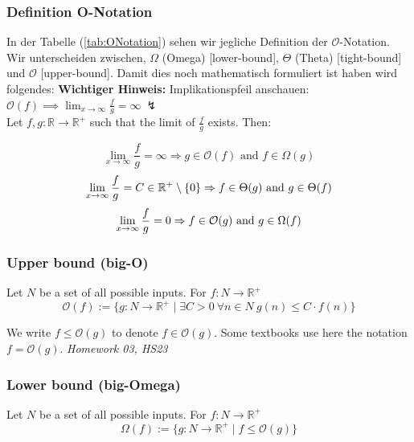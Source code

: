 \documentclass[a4paper]{article}
\begin{document}
    \subsubsection{Definition O-Notation}
    In der Tabelle (\ref{tab:ONotation}) sehen wir jegliche Definition der $\mathcal{O}$-Notation.
    Wir unterscheiden zwischen, $\Omega$ (Omega) [lower-bound], $\Theta$ (Theta) [tight-bound] und  $\mathcal{O}$ [upper-bound]. Damit dies noch mathematisch formuliert ist haben wird folgendes:   \textbf{Wichtiger Hinweis:} Implikationspfeil anschauen: $\mathcal{O}(f) \implies \lim_{x\to\infty}\frac fg = \infty \ \lightning$ \\
    Let $f, g: \mathbb{R} \rightarrow \mathbb{R}^+$ such that the limit of $\frac f g$ exists. Then:
    
    \begin{equation*}
    \lim_{x\to\infty}\frac fg = \infty \Rightarrow g \in \mathcal{O}(f) \text{ and } f \in \Omega(g)
    \end{equation*}
    \begin{equation*}
    \lim_{x \rightarrow \infty} \frac fg = C \in \mathbb{R}^+ \setminus \left\lbrace 0 \right\rbrace \Rightarrow f \in\Theta(g)  \text{ and } g \in\Theta(f) \\
    \end{equation*}
    \begin{equation*}
    \lim_{x \rightarrow \infty} \frac fg = 0 \Rightarrow f \in\mathcal{O}(g) \text{ and } g \in\Omega(f) \\
    \end{equation*}
    
    \subsubsection*{Upper bound (big-O)}
    Let ${N}$ be a set of all possible inputs. For $f: N \to \mathbb{R}^+$
    $$\mathcal{O}(f) :=\lbrace g: {N}\to\mathbb{R}^+\mid\exists C > 0 \ \forall n \in {N} \ g(n) \leq C \cdot f(n)\rbrace$$
    
    We write $f \leq \mathcal{O}(g)$ to denote $f \in \mathcal{O}(g)$. Some textbooks use here the notation $f = \mathcal{O}(g)$. \textit{Homework 03, HS23}
    
    \subsubsection*{Lower bound (big-Omega)}
    Let ${N}$ be a set of all possible inputs. For $f: N \to \mathbb{R}^+$
    $$\Omega(f) :=\lbrace g: {N} \to \mathbb{R}^+ \mid f \leq \mathcal{O}(g)\rbrace$$
    
\end{document}
